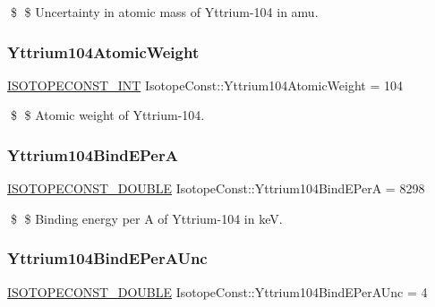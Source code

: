 \$ \$ Uncertainty in atomic mass of Yttrium-\/104 in amu. \mbox{\label{group___isotope_const-_yttrium-_y104_gabd27d6c43868d36bd6bd471f80290d2a}} 
\subsubsection{\texorpdfstring{Yttrium104\+Atomic\+Weight}{Yttrium104AtomicWeight}}
{\footnotesize\ttfamily \mbox{\hyperlink{group___isotope_const-_macros_ga5f18360b3e99483a35c32d789e62621c}{I\+S\+O\+T\+O\+P\+E\+C\+O\+N\+S\+T\+\_\+\+I\+NT}} Isotope\+Const\+::\+Yttrium104\+Atomic\+Weight = 104}

\$ \$ Atomic weight of Yttrium-\/104. \mbox{\label{group___isotope_const-_yttrium-_y104_gac9cb326791f8c4b93cf2b62024d0db2c}} 
\subsubsection{\texorpdfstring{Yttrium104\+Bind\+E\+PerA}{Yttrium104BindEPerA}}
{\footnotesize\ttfamily \mbox{\hyperlink{group___isotope_const-_macros_ga8f45a7272ce02c0b4c65c44636ed719a}{I\+S\+O\+T\+O\+P\+E\+C\+O\+N\+S\+T\+\_\+\+D\+O\+U\+B\+LE}} Isotope\+Const\+::\+Yttrium104\+Bind\+E\+PerA = 8298}

\$ \$ Binding energy per A of Yttrium-\/104 in keV. \mbox{\label{group___isotope_const-_yttrium-_y104_ga19ecac1baedcda6bbcce4a10cc938d3f}} 
\subsubsection{\texorpdfstring{Yttrium104\+Bind\+E\+Per\+A\+Unc}{Yttrium104BindEPerAUnc}}
{\footnotesize\ttfamily \mbox{\hyperlink{group___isotope_const-_macros_ga8f45a7272ce02c0b4c65c44636ed719a}{I\+S\+O\+T\+O\+P\+E\+C\+O\+N\+S\+T\+\_\+\+D\+O\+U\+B\+LE}} Isotope\+Const\+::\+Yttrium104\+Bind\+E\+Per\+A\+Unc = 4}

